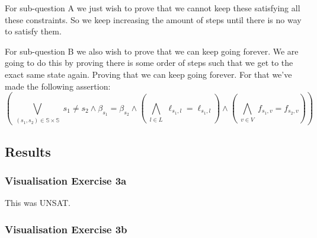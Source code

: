         \noindent For sub-question A we just wish to prove that we cannot keep these
        satisfying all these constraints. So we keep increasing the amount of steps
        until there is no way to satisfy them.

        For sub-question B we also wish to prove that we can keep going
        forever. We are going to do this by proving there is some order of steps
        such that we get to the exact same state again. Proving that we can keep
        going forever. For that we've made the following assertion:
        \[
            \left(
                \bigvee_{\substack{
                    (s_1, s_2) \in \mathbb{S} \times \mathbb{S}
                }}
                s_1 \not = s_2 
                \wedge \beta_{s_1} = \beta_{s_2}
                \wedge \left(
                    \bigwedge_{\substack{
                        l \in L
                    }} \ell_{s_1,l} = \ell_{s_1,l}
                \right)
                \wedge \left(
                    \bigwedge_{\substack{
                        v \in V
                    }} f_{s_1,v} = f_{s_2,v}
                \right)
            \right)
        \]

    \subsection{Results}

        \subsubsection{Visualisation Exercise 3a}
            This was UNSAT.

        \subsubsection{Visualisation Exercise 3b}

